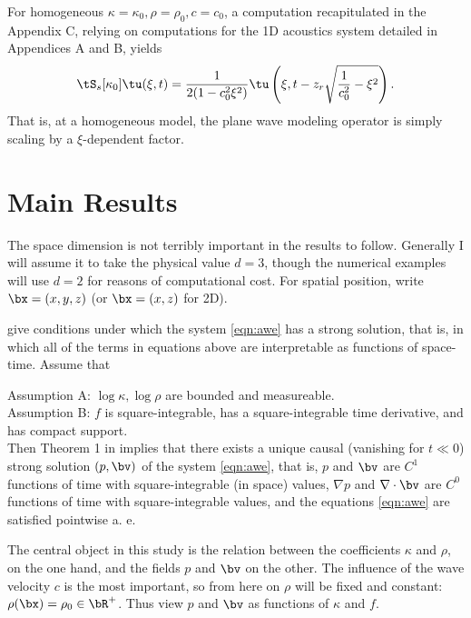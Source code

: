For homogeneous $\kappa=\kappa_0, \rho=\rho_0, c=c_0$, a computation
recapitulated in the Appendix C, relying on computations for the 1D
acoustics system detailed in Appendices A and B, yields
\begin{equation}
\label{eqn:modhom}
\tS_s[\kappa_0]\tu(\xi,t) = \frac{1}{2(1-c_0^2\xi^2)}\tu
\left(\xi,t-z_r\sqrt{\frac{1}{c_0^2}-\xi^2}\right).
\end{equation}
That is, at a homogeneous model, the plane wave modeling operator is
simply scaling by a $\xi$-dependent factor.


\section{Main Results}

The space dimension is not terribly important in the results to
follow. Generally I will assume it to take the physical value $d=3$,
though the numerical examples will use $d=2$ for reasons of
computational cost. For spatial position, write $\bx = (x,y,z)$ (or $\bx = (x,z)$ for
2D).

\cite{BlazekStolkSymes:13} give conditions under which the system
\ref{eqn:awe} has a strong solution, that is, in which all of the
terms in equations above are interpretable as functions of space-time. Assume that

\indent Assumption A: $\log \kappa, \log \rho$ are bounded and
measureable. \\

\indent Assumption B: $f$ is square-integrable, has a square-integrable time
  derivative, and \\has compact support.\\

Then Theorem 1 in \cite{BlazekStolkSymes:13} implies that there exists
a unique causal (vanishing for $t \ll 0$) strong solution
$(p,\bv)$ of the system \ref{eqn:awe}, that is, $p$ and $\bv$ are
$C^1$ functions of time with square-integrable (in space) values,
$\nabla p$ and $\nabla \cdot \bv$ are $C^0$ functions of time with
square-integrable values,  and the equations \ref{eqn:awe} are
satisfied pointwise a. e.

The central object in this study is the relation between the
coefficients $\kappa$ and $\rho$, on the one hand, and the fields $p$
and $\bv$ on the other. The influence of the wave velocity $c$ is the
most important, so from here on $\rho$ will be fixed and constant:
$\rho(\bx) = \rho_0 \in \bR^+$. Thus view $p$ and $\bv$ as functions of
$\kappa$ and $f$.

